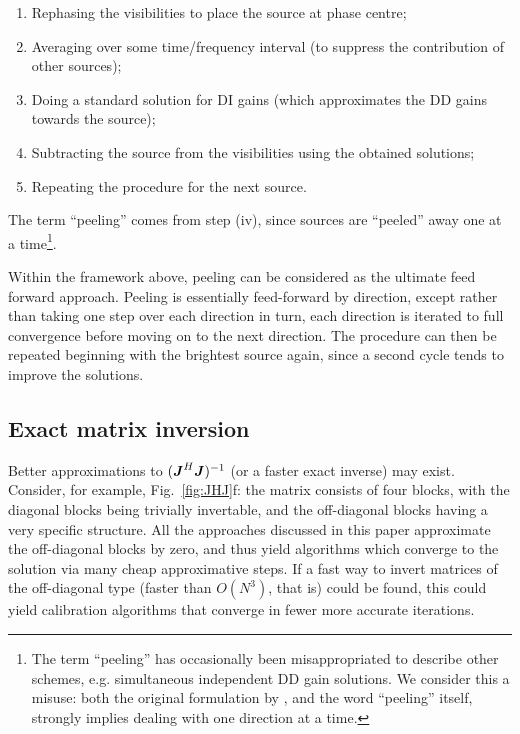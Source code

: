 \documentclass[useAMS,usenatbib]{mn2e}
\newcommand{\mat}[1]{{\bmath{#1}}}
\newcommand{\JJ}{\mat{J}} %
\newcommand{\JHJ}{\JJ^H\JJ} %
\numberwithin{equation}{section}
\begin{document}
\begin{enumerate}
\item Rephasing the visibilities to place the source at phase centre;
\item Averaging over some time/frequency interval (to suppress the contribution of other sources);
\item Doing a standard solution for DI gains (which approximates the DD gains towards the source);
\item Subtracting the source from the visibilities using the obtained solutions;
\item Repeating the procedure for the next source.
\end{enumerate}

The term ``peeling'' comes from step (iv), since sources are ``peeled'' away one at a time\footnote{The term ``peeling'' has 
occasionally been misappropriated to describe other schemes, e.g. simultaneous independent DD gain solutions. We consider this a 
misuse: both the original formulation by \citet{JEN:peeling}, and the word ``peeling'' itself, strongly implies dealing with 
one direction at a time.}.

Within the framework above, peeling can be considered as the ultimate feed forward approach. Peeling is essentially feed-forward by direction, except rather than taking one step over each direction in turn, each direction is iterated to full convergence before moving on to the next direction. The procedure can then be repeated beginning with the brightest source again, since a second cycle tends to improve the solutions. 

\subsection{Exact matrix inversion}

Better approximations to $(\JHJ)^{-1}$ (or a faster exact inverse) may exist. Consider, for example, Fig.~\ref{fig:JHJ}f: 
the matrix consists of four blocks, with the diagonal blocks being trivially invertable, and the off-diagonal blocks having a 
very specific structure. All the approaches discussed in this paper approximate the off-diagonal blocks by zero, and thus 
yield algorithms which converge to the solution via many cheap approximative steps. If a fast way to invert matrices of the 
off-diagonal type (faster than $O(N^3)$, that is) could be found, this could yield calibration algorithms that converge in fewer 
more accurate iterations.
\end{document}
